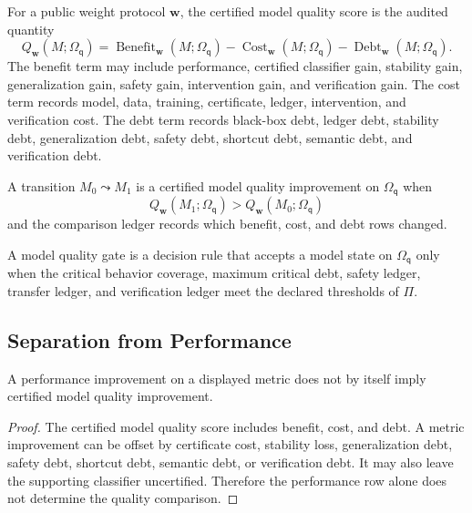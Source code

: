 \begin{definition}
\label{def:philosophy-certified-model-quality-score}
For a public weight protocol $\mathbf w$, the certified model quality
score is the audited quantity
$$
Q_{\mathbf w}(M;\Omega_{\mathsf{q}})
=
\operatorname{Benefit}_{\mathbf w}(M;\Omega_{\mathsf{q}})
-
\operatorname{Cost}_{\mathbf w}(M;\Omega_{\mathsf{q}})
-
\operatorname{Debt}_{\mathbf w}(M;\Omega_{\mathsf{q}}).
$$
The benefit term may include performance, certified classifier gain,
stability gain, generalization gain, safety gain, intervention gain, and
verification gain. The cost term records model, data, training,
certificate, ledger, intervention, and verification cost. The debt term
records black-box debt, ledger debt, stability debt, generalization
debt, safety debt, shortcut debt, semantic debt, and verification debt.
\end{definition}

\begin{definition}
\label{def:philosophy-model-quality-improvement}
A transition $M_0\leadsto M_1$ is a certified model quality improvement
on $\Omega_{\mathsf{q}}$ when
$$
Q_{\mathbf w}(M_1;\Omega_{\mathsf{q}})
>
Q_{\mathbf w}(M_0;\Omega_{\mathsf{q}})
$$
and the comparison ledger records which benefit, cost, and debt rows
changed.
\end{definition}

\begin{definition}
\label{def:philosophy-model-quality-gate}
A model quality gate is a decision rule that accepts a model state on
$\Omega_{\mathsf{q}}$ only when the critical behavior coverage, maximum
critical debt, safety ledger, transfer ledger, and verification ledger
meet the declared thresholds of $\Pi$.
\end{definition}

\subsection{Separation from Performance}
\label{subsec:philosophy-certified-model-quality-performance-separation}

\begin{theorem}
\label{thm:philosophy-performance-gain-not-quality-gain}
A performance improvement on a displayed metric does not by itself imply
certified model quality improvement.
\end{theorem}
\begin{proof}
The certified model quality score includes benefit, cost, and debt. A
metric improvement can be offset by certificate cost, stability loss,
generalization debt, safety debt, shortcut debt, semantic debt, or
verification debt. It may also leave the supporting classifier
uncertified. Therefore the performance row alone does not determine the
quality comparison.
\end{proof}

